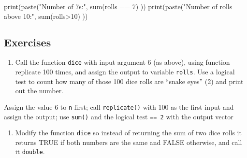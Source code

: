 \documentclass[
  letterpaper,
  DIV=11,
  numbers=noendperiod]{scrreprt}
\newenvironment{Shaded}{\begin{snugshade}}{\end{snugshade}}
\newcommand{\NormalTok}[1]{\textcolor[rgb]{0.00,0.23,0.31}{#1}}
\providecommand{\tightlist}{%
  \setlength{\itemsep}{0pt}\setlength{\parskip}{0pt}}\usepackage{longtable,booktabs,array}
\begin{document}
\begin{Shaded}
\begin{Highlighting}[]
\NormalTok{print(paste("Number of 7s:", sum(rolls == 7) ))}
\NormalTok{print(paste("Number of rolls above 10:", sum(rolls\textgreater{}10) ))  }
\end{Highlighting}
\end{Shaded}

\hypertarget{exercises-31}{%
\subsection*{Exercises}\label{exercises-31}}

\begin{enumerate}
\def\labelenumi{\arabic{enumi}.}
\tightlist
\item
  Call the function \texttt{dice} with input argument 6 (as above),
  using function replicate 100 times, and assign the output to variable
  \texttt{rolls}. Use a logical test to count how many of those 100 dice
  rolls are ``snake eyes'' (2) and print out the number.
\end{enumerate}

\begin{Shaded}
\begin{Highlighting}[]

\end{Highlighting}
\end{Shaded}

\begin{tcolorbox}[enhanced jigsaw, arc=.35mm, colframe=quarto-callout-caution-color-frame, left=2mm, opacitybacktitle=0.6, breakable, title=\textcolor{quarto-callout-caution-color}{\faFire}\hspace{0.5em}{Hint}, toprule=.15mm, coltitle=black, bottomtitle=1mm, toptitle=1mm, colback=white, leftrule=.75mm, colbacktitle=quarto-callout-caution-color!10!white, titlerule=0mm, opacityback=0, rightrule=.15mm, bottomrule=.15mm]

Assign the value 6 to \texttt{n} first; call \texttt{replicate()} with
100 as the first input and assign the output; use \texttt{sum()} and the
logical test \texttt{==\ 2} with the output vector

\end{tcolorbox}

\begin{enumerate}
\def\labelenumi{\arabic{enumi}.}
\setcounter{enumi}{1}
\tightlist
\item
  Modify the function \texttt{dice} so instead of returning the sum of
  two dice rolls it returns TRUE if both numbers are the same and FALSE
  otherwise, and call it \texttt{double}.
\end{enumerate}
\end{document}
